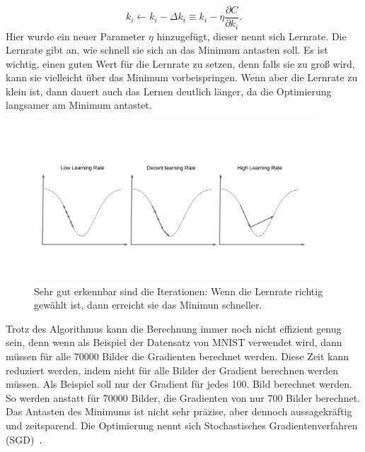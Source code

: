 \documentclass[11pt]{article}
\begin{document}
\begin{equation}
    k_i \leftarrow k_i - \Delta k_i \equiv  k_i - \eta \frac{\partial C}{\partial k_{i}}.
\end{equation}
Hier wurde ein neuer Parameter $\eta$ hinzugefügt, dieser nennt sich Lernrate. Die Lernrate gibt an, wie schnell sie sich an das Minimum antasten soll.
Es ist wichtig, einen guten Wert für die Lernrate zu setzen, denn falls sie zu groß wird, kann sie vielleicht über das Minimum vorbeispringen.
Wenn aber die Lernrate zu klein ist, dann dauert auch das Lernen deutlich länger, da die Optimierung langsamer am Minimum antastet.
\begin{figure}[h]
    \centering
    \includegraphics[width=300pt, keepaspectratio]{images/lrate}
    \caption[Einstellen der Lernrate~\cite{22}]{Sehr gut erkennbar sind die Iterationen: Wenn die Lernrate richtig gewählt ist, dann erreicht sie das Minimun schneller.~\cite{22}}
\end{figure}
Trotz des Algorithmus kann die Berechnung immer noch nicht effizient genug sein, denn wenn als
Beispiel der Datensatz von MNIST verwendet wird, dann müssen für alle 70000 Bilder die Gradienten berechnet werden. Diese Zeit kann reduziert werden,
indem nicht für alle Bilder der Gradient berechnen werden müssen. Als Beispiel soll nur der Gradient für jedes 100. Bild berechnet werden. So werden anstatt
für 70000 Bilder, die Gradienten von nur 700 Bilder berechnet. Das Antasten des Minimums ist nicht sehr präzise, aber dennoch aussagekräftig und zeitsparend. Die
Optimierung nennt sich Stochastisches Gradientenverfahren (SGD)~\cite{8}.
\end{document}
